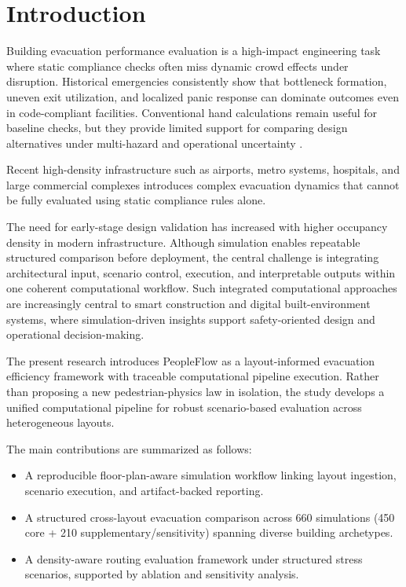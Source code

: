 \documentclass[utf8]{FrontiersinHarvard}
\begin{document}
\section{Introduction}

Building evacuation performance evaluation is a high-impact engineering task where static compliance checks often miss dynamic crowd effects under disruption. Historical emergencies consistently show that bottleneck formation, uneven exit utilization, and localized panic response can dominate outcomes even in code-compliant facilities. Conventional hand calculations remain useful for baseline checks, but they provide limited support for comparing design alternatives under multi-hazard and operational uncertainty \cite{sfpe,evac_review}.

Recent high-density infrastructure such as airports, metro systems, hospitals, and large commercial complexes introduces complex evacuation dynamics that cannot be fully evaluated using static compliance rules alone.

The need for early-stage design validation has increased with higher occupancy density in modern infrastructure. Although simulation enables repeatable structured comparison before deployment, the central challenge is integrating architectural input, scenario control, execution, and interpretable outputs within one coherent computational workflow. Such integrated computational approaches are increasingly central to smart construction and digital built-environment systems, where simulation-driven insights support safety-oriented design and operational decision-making.

The present research introduces PeopleFlow as a layout-informed evacuation efficiency framework with traceable computational pipeline execution. Rather than proposing a new pedestrian-physics law in isolation, the study develops a unified computational pipeline for robust scenario-based evaluation across heterogeneous layouts.

The main contributions are summarized as follows:
\begin{itemize}
    \item A reproducible floor-plan-aware simulation workflow linking layout ingestion, scenario execution, and artifact-backed reporting.
    \item A structured cross-layout evacuation comparison across 660 simulations (450 core + 210 supplementary/sensitivity) spanning diverse building archetypes.
    \item A density-aware routing evaluation framework under structured stress scenarios, supported by ablation and sensitivity analysis.
\end{itemize}
\end{document}
